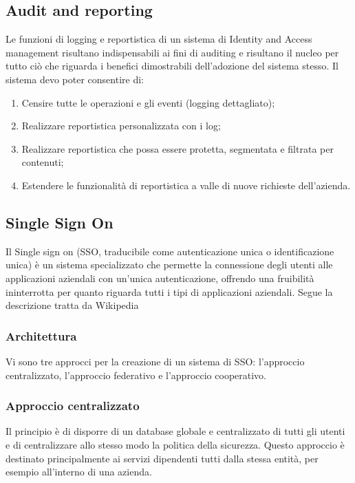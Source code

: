 \subsection{Audit and reporting}
Le funzioni di logging e reportistica di un sistema di Identity and Access
management risultano indispensabili ai fini di auditing e risultano il nucleo
per tutto ciò che riguarda i benefici dimostrabili dell’adozione del sistema
stesso. Il sistema devo poter consentire di:
\begin{enumerate}
\item Censire tutte le operazioni e gli eventi (logging dettagliato);
\item Realizzare reportistica personalizzata con i log;
\item Realizzare reportistica che possa essere protetta, segmentata e filtrata
per contenuti;
\item Estendere le funzionalità di reportistica a valle di nuove richieste
dell’azienda.
\end{enumerate}

\subsection{Single Sign On}
Il Single sign on (SSO, traducibile come autenticazione unica o identificazione
unica) è un sistema specializzato che permette la connessione degli utenti alle
applicazioni aziendali con un’unica autenticazione, offrendo una fruibilità
ininterrotta per quanto riguarda tutti i tipi di applicazioni aziendali.
Segue la descrizione tratta da Wikipedia~\cite{wikipedia}

\subsubsection{Architettura}

Vi sono tre approcci per la creazione di un sistema di SSO: l'approccio
centralizzato, l'approccio federativo e l'approccio cooperativo.

\subsubsection{Approccio centralizzato}

Il principio è di disporre di un database globale e centralizzato di tutti gli
utenti e di centralizzare allo stesso modo la politica della sicurezza. Questo
approccio è destinato principalmente ai servizi dipendenti tutti dalla stessa
entità, per esempio all'interno di una azienda.

